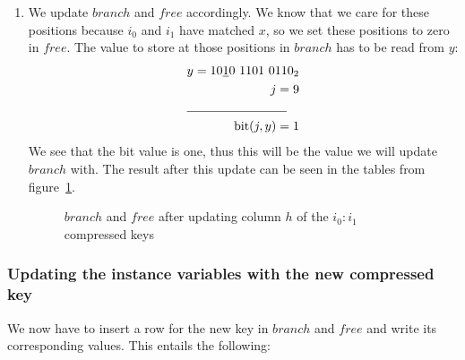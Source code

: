 \begin{enumerate}
    \item
    We update $branch$ and $free$ accordingly. We know that we care for these positions because $i_0$ and $i_1$ have matched $x$, so we set these positions to zero in $free$. The value to store at those positions in $branch$ has to be read from $y$:
    \begin{align*}
        y = 10\underline{1}0\ 1101\ 0110_2 \\
        j = 9 \\
        \cline{1-2}
        \text{bit}(j, y) = 1
    \end{align*}
    We see that the bit value is one, thus this will be the value we will update $branch$ with. The result after this update can be seen in the tables from figure~\ref{fig:branchAndFreeAfterMatrixMi_0Mi_1h}.
    \begin{figure}[H]
    \centering
    
    \caption{$branch$ and $free$ after updating column $h$ of the $i_0:i_1$ compressed keys}
    \label{fig:branchAndFreeAfterMatrixMi_0Mi_1h}
    \end{figure}
\end{enumerate}

\subsubsection{Updating the instance variables with the new compressed key} \label{sec:updateRankRow}

We now have to insert a row for the new key in $branch$ and $free$ and write its corresponding values. This entails the following:

